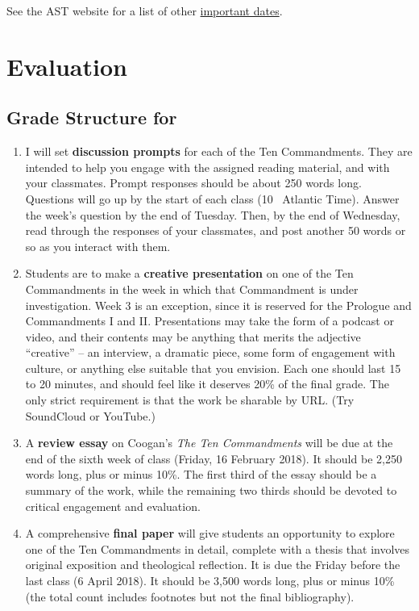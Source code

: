 \documentclass[titlepage]{article}
\begin{document}
See the AST website for a list of other \href{http://www.astheology.ns.ca/students/academic-dates.html}{important dates}.

\section{Evaluation}
\label{evaluation}

\subsection{Grade Structure for \ccode}
\label{structure}

\begin{enumerate}

	\item I will set \textbf{discussion prompts} for each of the Ten
	Commandments. They are intended to help you engage with the assigned
	reading material, and with your classmates. Prompt responses should
	be about 250 words long. Questions will go up by the start of each
	class (10 \AM\ Atlantic Time). Answer the week's question by the end
	of Tuesday. Then, by the end of Wednesday, read through the
	responses of your classmates, and post another 50 words or so as you
	interact with them.

	\item Students are to make a \textbf{creative presentation} on one
	of the Ten Commandments in the week in which that Commandment is
	under investigation. Week 3 is an exception, since it is reserved
	for the Prologue and Commandments I and II. Presentations may take
	the form of a podcast or video, and their contents may be anything
	that merits the adjective “creative” -- an interview, a dramatic
	piece, some form of engagement with culture, or anything else
	suitable that you envision. Each one should last 15 to 20 minutes,
	and should feel like it deserves 20\% of the final grade. The only
	strict requirement is that the work be sharable by URL. (Try
	SoundCloud or YouTube.)

	\item A \textbf{review essay} on Coogan's \emph{The Ten
	Commandments} will be due at the end of the sixth week of class
	(Friday, 16 February 2018). It should be 2,250 words long, plus or
	minus 10\%. The first third of the essay should be a summary of the
	work, while the remaining two thirds should be devoted to critical
	engagement and evaluation.

	\item A comprehensive \textbf{final paper} will give students an
	opportunity to explore one of the Ten Commandments in detail,
	complete with a thesis that involves original exposition and
	theological reflection. It is due the Friday before the last class
	(6 April 2018). It should be 3,500 words long, plus or minus 10\%
	(the total count includes footnotes but not the final bibliography).

\end{enumerate}
\end{document}
